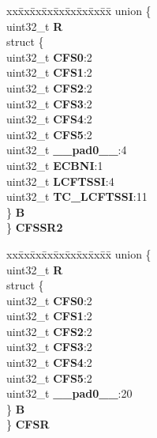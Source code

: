 \begin{DoxyCompactItemize}
\begin{tabbing}
\end{tabbing}\item 
\mbox{\label{structEQADC__tag_a184d90958c4e491caa3775779e87120f}} 
\begin{tabbing}
xx\=xx\=xx\=xx\=xx\=xx\=xx\=xx\=xx\=\kill
union \{\\
\>uint32\_t {\bfseries R}\\
\>struct \{\\
\>\>uint32\_t {\bfseries CFS0}:2\\
\>\>uint32\_t {\bfseries CFS1}:2\\
\>\>uint32\_t {\bfseries CFS2}:2\\
\>\>uint32\_t {\bfseries CFS3}:2\\
\>\>uint32\_t {\bfseries CFS4}:2\\
\>\>uint32\_t {\bfseries CFS5}:2\\
\>\>uint32\_t {\bfseries \_\_pad0\_\_}:4\\
\>\>uint32\_t {\bfseries ECBNI}:1\\
\>\>uint32\_t {\bfseries LCFTSSI}:4\\
\>\>uint32\_t {\bfseries TC\_LCFTSSI}:11\\
\>\} {\bfseries B}\\
\} {\bfseries CFSSR2}\\

\end{tabbing}\item 
\mbox{\label{structEQADC__tag_aba75320cb5b3fb64cb9a78c48abbbb57}} 
\begin{tabbing}
xx\=xx\=xx\=xx\=xx\=xx\=xx\=xx\=xx\=\kill
union \{\\
\>uint32\_t {\bfseries R}\\
\>struct \{\\
\>\>uint32\_t {\bfseries CFS0}:2\\
\>\>uint32\_t {\bfseries CFS1}:2\\
\>\>uint32\_t {\bfseries CFS2}:2\\
\>\>uint32\_t {\bfseries CFS3}:2\\
\>\>uint32\_t {\bfseries CFS4}:2\\
\>\>uint32\_t {\bfseries CFS5}:2\\
\>\>uint32\_t {\bfseries \_\_pad0\_\_}:20\\
\>\} {\bfseries B}\\
\} {\bfseries CFSR}\\


\end{tabbing}
\end{DoxyCompactItemize}
